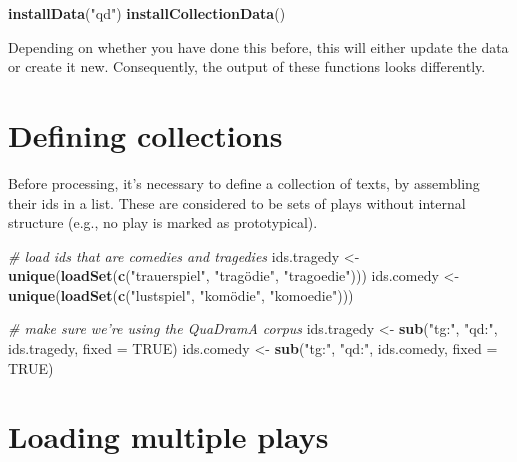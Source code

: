 \documentclass[]{book}
\newenvironment{Shaded}{\begin{snugshade}}{\end{snugshade}}
\newcommand{\CommentTok}[1]{\textcolor[rgb]{0.56,0.35,0.01}{\textit{#1}}}
\newcommand{\DataTypeTok}[1]{\textcolor[rgb]{0.13,0.29,0.53}{#1}}
\newcommand{\KeywordTok}[1]{\textcolor[rgb]{0.13,0.29,0.53}{\textbf{#1}}}
\newcommand{\NormalTok}[1]{#1}
\newcommand{\OtherTok}[1]{\textcolor[rgb]{0.56,0.35,0.01}{#1}}
\newcommand{\StringTok}[1]{\textcolor[rgb]{0.31,0.60,0.02}{#1}}
\begin{document}
\begin{Shaded}
\begin{Highlighting}[]
\KeywordTok{installData}\NormalTok{(}\StringTok{"qd"}\NormalTok{)}
\KeywordTok{installCollectionData}\NormalTok{()}
\end{Highlighting}
\end{Shaded}

Depending on whether you have done this before, this will either update the data or create it new. Consequently, the output of these functions looks differently.

\hypertarget{defining-collections}{%
\section{Defining collections}\label{defining-collections}}

Before processing, it's necessary to define a collection of texts, by assembling their ids in a list. These are considered to be sets of plays without internal structure (e.g., no play is marked as prototypical).

\begin{Shaded}
\begin{Highlighting}[]
\CommentTok{# load ids that are comedies and tragedies}
\NormalTok{ids.tragedy <-}\StringTok{ }\KeywordTok{unique}\NormalTok{(}\KeywordTok{loadSet}\NormalTok{(}\KeywordTok{c}\NormalTok{(}\StringTok{"trauerspiel"}\NormalTok{, }\StringTok{"tragödie"}\NormalTok{, }\StringTok{"tragoedie"}\NormalTok{)))}
\NormalTok{ids.comedy <-}\StringTok{ }\KeywordTok{unique}\NormalTok{(}\KeywordTok{loadSet}\NormalTok{(}\KeywordTok{c}\NormalTok{(}\StringTok{"lustspiel"}\NormalTok{, }\StringTok{"komödie"}\NormalTok{, }\StringTok{"komoedie"}\NormalTok{)))}

\CommentTok{# make sure we're using the QuaDramA corpus}
\NormalTok{ids.tragedy <-}\StringTok{ }\KeywordTok{sub}\NormalTok{(}\StringTok{"tg:"}\NormalTok{, }\StringTok{"qd:"}\NormalTok{, ids.tragedy, }\DataTypeTok{fixed =} \OtherTok{TRUE}\NormalTok{)}
\NormalTok{ids.comedy <-}\StringTok{ }\KeywordTok{sub}\NormalTok{(}\StringTok{"tg:"}\NormalTok{, }\StringTok{"qd:"}\NormalTok{, ids.comedy, }\DataTypeTok{fixed =} \OtherTok{TRUE}\NormalTok{)}
\end{Highlighting}
\end{Shaded}

\hypertarget{loading-multiple-plays}{%
\section{Loading multiple plays}\label{loading-multiple-plays}}
\end{document}
